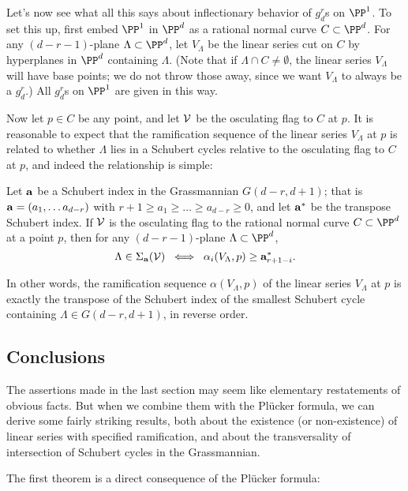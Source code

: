 Let's now see what all this says about inflectionary behavior of $g^r_d$s on $\PP^1$. To set this up, first embed $\PP^1$ in $\PP^d$ as a rational normal curve $C \subset \PP^d$. For any $(d-r-1)$-plane $\Lambda \subset \PP^d$, let $V_\Lambda$ be the linear series cut on $C$ by hyperplanes in $\PP^d$ containing $\Lambda$. (Note that if $\Lambda \cap C \neq \emptyset$, the linear series $V_\Lambda$ will have base points; we do not throw those away, since we want $V_\Lambda$ to always be a $g^r_d$.) All $g^r_d$s on $\PP^1$ are given in this way.

Now let $p \in C$ be any point, and let $\cal V$ be the osculating flag to $C$ at $p$. It is reasonable to expect that the ramification sequence of the linear series $V_\Lambda$ at $p$ is related to whether $\Lambda$ lies in a Schubert cycles relative to the osculating flag to $C$ at $p$, and indeed the relationship is simple:

\begin{proposition}\label{ramification}
Let ${\bf a}$ be a Schubert index in the Grassmannian $G(d-r, d+1)$; that is ${\bf a} = (a_1, \dots a_{d-r})$ with $r+1 \geq a_1 \geq \dots \geq a_{d-r} \geq 0$, and let ${\bf a}^*$ be the transpose Schubert index. If $\cal V$ is the osculating flag to the rational normal curve $C \subset \PP^d$ at a point $p$,
then for any $(d-r-1)$-plane $\Lambda \subset \PP^d$, 
$$
\Lambda \in \Sigma_{\bf a}({\cal V}) \; \iff \; \alpha_i(V_\Lambda, p) \geq {\bf a}^*_{r+1-i}.
$$
\end{proposition} 

In other words, the ramification sequence $\alpha(V_\Lambda, p)$ of the linear series $V_\Lambda$ at $p$ is exactly the transpose of the Schubert index of the smallest Schubert cycle containing $\Lambda \in G(d-r, d+1)$, in reverse order.

\subsection{Conclusions}

The assertions made in the last section may seem like elementary restatements of obvious facts. But when we combine them with the Pl\"ucker formula, we can derive some fairly striking results, both about the existence (or non-existence) of linear series with specified ramification, and about the transversality of intersection of Schubert cycles in the Grassmannian.

The first theorem is a direct consequence of the Pl\"ucker formula:

